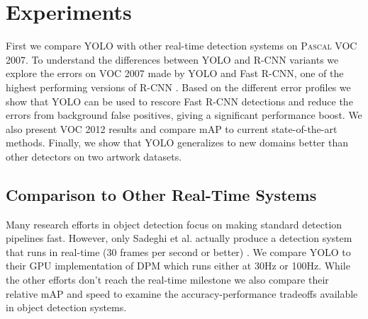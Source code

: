\section{Experiments}

First we compare YOLO with other real-time detection systems on \textsc{Pascal} VOC 2007. To understand the differences between YOLO and R-CNN variants we explore the errors on VOC 2007 made by YOLO and Fast R-CNN, one of the highest performing versions of R-CNN \cite{DBLP:journals/corr/Girshick15}. Based on the different error profiles we show that YOLO can be used to rescore Fast R-CNN detections and reduce the errors from background false positives, giving a significant performance boost. We also present VOC 2012 results and compare mAP to current state-of-the-art methods. Finally, we show that YOLO generalizes to new domains better than other detectors on two artwork datasets.

\subsection{Comparison to Other Real-Time Systems}

Many research efforts in object detection focus on making standard detection pipelines fast. \cite{dean2013fast} \cite{yan2014fastest} \cite{sadeghi201430hz} \cite{DBLP:journals/corr/Girshick15} \cite{he2014spatial} \cite{ren2015faster} However, only Sadeghi et al. actually produce a detection system that runs in real-time (30 frames per second or better) \cite{sadeghi201430hz}. We compare YOLO to their GPU implementation of DPM which runs either at 30Hz or 100Hz. While the other efforts don't reach the real-time milestone we also compare their relative mAP and speed to examine the accuracy-performance tradeoffs available in object detection systems.

